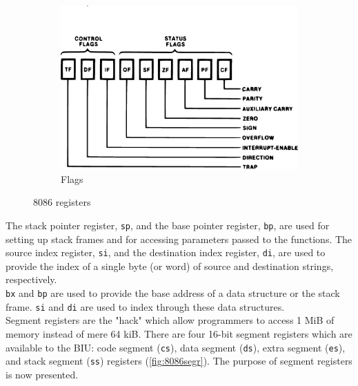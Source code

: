\begin{figure}[h]
\begin{subfigure}{0.9\textwidth}
  \includegraphics[scale=0.25]{figures/8086flags.eps}
  \caption{Flags}
  \label{fig:8086flag}
  \end{subfigure}
 \caption{8086 registers \cite{intel1979the}}
\end{figure}
The stack pointer register, \verb|sp|, and the base pointer register, \verb|bp|, are used for setting up stack frames and for accessing parameters passed to the functions. The source index register, \verb|si|, and the destination index register, \verb|di|, are used to provide the index of a single byte (or word) of source and destination strings, respectively.\\
\verb|bx| and \verb|bp| are used to provide the base address of a data structure or the stack frame. \verb|si| and \verb|di| are used to index through these data structures.\\
Segment registers are the "hack" which allow programmers to access 1 MiB of memory instead of mere 64 kiB. There are four 16-bit segment registers which are available to the BIU: code segment (\verb|cs|), data segment (\verb|ds|), extra segment (\verb|es|), and stack segment (\verb|ss|) registers (\autoref{fig:8086segr}). The purpose of segment registers is now presented.\\
